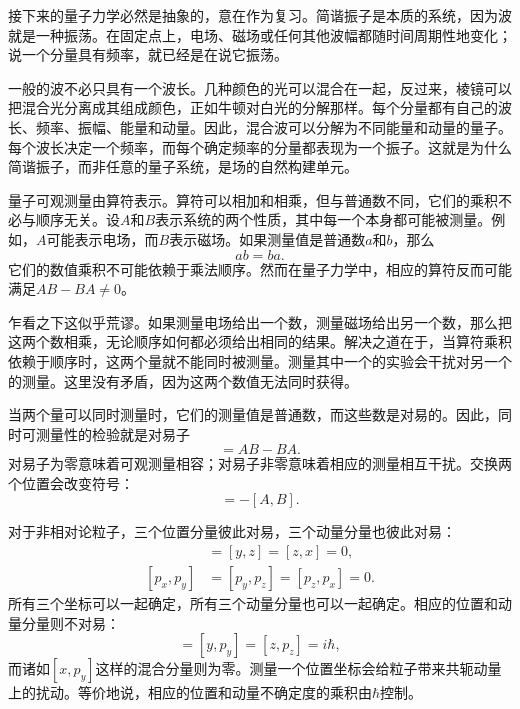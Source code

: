 接下来的量子力学必然是抽象的，意在作为复习。简谐振子是本质的系统，因为波就是一种振荡。在固定点上，电场、磁场或任何其他波幅都随时间周期性地变化；说一个分量具有频率，就已经是在说它振荡。

一般的波不必只具有一个波长。几种颜色的光可以混合在一起，反过来，棱镜可以把混合光分离成其组成颜色，正如牛顿对白光的分解那样。每个分量都有自己的波长、频率、振幅、能量和动量。因此，混合波可以分解为不同能量和动量的量子。每个波长决定一个频率，而每个确定频率的分量都表现为一个振子。这就是为什么简谐振子，而非任意的量子系统，是场的自然构建单元。

量子可观测量由算符表示。算符可以相加和相乘，但与普通数不同，它们的乘积不必与顺序无关。设\(A\)和\(B\)表示系统的两个性质，其中每一个本身都可能被测量。例如，\(A\)可能表示电场，而\(B\)表示磁场。如果测量值是普通数\(a\)和\(b\)，那么
\begin{equation}
ab=ba.
\end{equation}
它们的数值乘积不可能依赖于乘法顺序。然而在量子力学中，相应的算符反而可能满足\(AB-BA\neq0\)。

乍看之下这似乎荒谬。如果测量电场给出一个数，测量磁场给出另一个数，那么把这两个数相乘，无论顺序如何都必须给出相同的结果。解决之道在于，当算符乘积依赖于顺序时，这两个量就不能同时被测量。测量其中一个的实验会干扰对另一个的测量。这里没有矛盾，因为这两个数值无法同时获得。

当两个量可以同时测量时，它们的测量值是普通数，而这些数是对易的。因此，同时可测量性的检验就是对易子
\begin{equation}
[A,B]=AB-BA.
\end{equation}
对易子为零意味着可观测量相容；对易子非零意味着相应的测量相互干扰。交换两个位置会改变符号：
\begin{equation}
[B,A]=-[A,B].
\end{equation}

对于非相对论粒子，三个位置分量彼此对易，三个动量分量也彼此对易：
\begin{align}
[x,y]&=[y,z]=[z,x]=0,\\
[p_x,p_y]&=[p_y,p_z]=[p_z,p_x]=0.
\end{align}
所有三个坐标可以一起确定，所有三个动量分量也可以一起确定。相应的位置和动量分量则不对易：
\begin{equation}
[x,p_x]=[y,p_y]=[z,p_z]=i\hbar,
\end{equation}
而诸如\([x,p_y]\)这样的混合分量则为零。测量一个位置坐标会给粒子带来共轭动量上的扰动。等价地说，相应的位置和动量不确定度的乘积由\(\hbar\)控制。

\begin{classroomqa}
\end{classroomqa}

